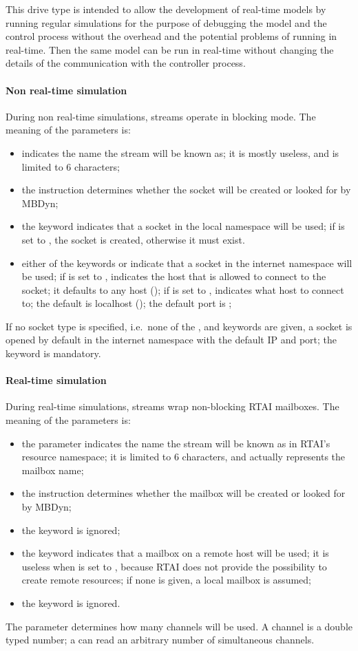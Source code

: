 This drive type is intended to allow the development of real-time models
by running regular simulations for the purpose of debugging the model
and the control process without the overhead and the potential problems
of running in real-time.
Then the same model can be run in real-time without changing the details
of the communication with the controller process.

\paragraph{Non real-time simulation}
During non real-time simulations, streams operate in blocking mode.
The meaning of the parameters is:
\begin{itemize}
\item {} indicates the name the stream
will be known as; it is mostly useless, and is limited to 6 characters;
\item the instruction  determines whether the socket will be
created or looked for by MBDyn;
\item the keyword  indicates that a socket 
in the local namespace will be used; if  is set to ,
the socket is created, otherwise it must exist.
\item either of the keywords  or  indicate that a socket
in the internet namespace will be used;
if  is set to ,  indicates 
the host that is allowed to connect to the socket; it defaults 
to any host (); if  is set to ,
 indicates what host to connect to; the default 
is localhost (); the default port is ;
\end{itemize}
If no socket type is specified, i.e.\ none of the ,  
and  keywords are given, a socket is opened by default 
in the internet namespace with the default IP and port; the 
keyword is mandatory.

\paragraph{Real-time simulation}
During real-time simulations, streams wrap non-blocking RTAI mailboxes.
The meaning of the parameters is:
\begin{itemize}
\item the parameter  indicates the name the stream
will be known as in RTAI's resource namespace;
it is limited to 6 characters, and actually represents the mailbox name;
\item the instruction  determines whether the mailbox will be
created or looked for by MBDyn;
\item the keyword  is ignored;
\item the keyword  indicates that a mailbox on a remote host 
will be used; it is useless when  is set to , because
RTAI does not provide the possibility to create remote resources;
if none is given, a local mailbox is assumed;
\item the keyword  is ignored.
\end{itemize}

The parameter  determines how many
channels will be used.
A channel is a double typed number; a  can read
an arbitrary number of simultaneous channels.
